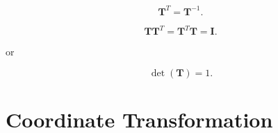 \begin{enumerate}
\begin{bbox}[0.85]
            \begin{equation}
                \mathbf{T}^{T} = \mathbf{T}^{-1}
            .\end{equation}

            \begin{equation}
                \mathbf{T}\mathbf{T}^{T} = \mathbf{T}^{T}\mathbf{T} = \mathbf{I}
            .\end{equation}

            or

            \begin{equation}
                \det(\mathbf{T}) = 1
            .\end{equation}
        \end{bbox}

\end{enumerate}


\section{Coordinate Transformation}


